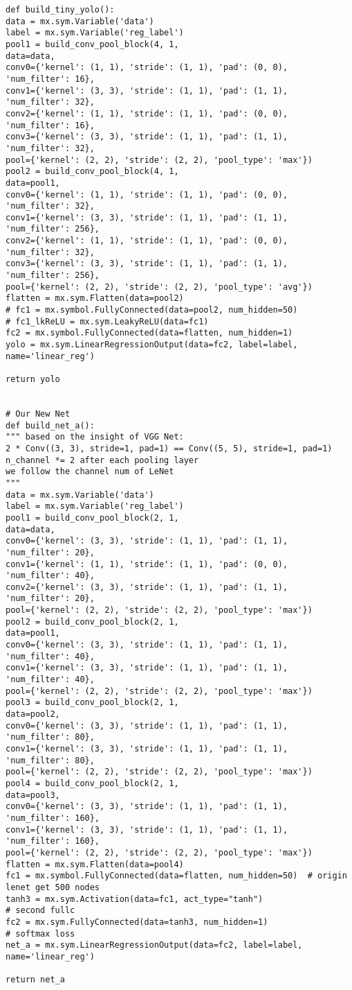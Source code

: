 \begin{verbatim}
def build_tiny_yolo():
data = mx.sym.Variable('data')
label = mx.sym.Variable('reg_label')
pool1 = build_conv_pool_block(4, 1,
data=data,
conv0={'kernel': (1, 1), 'stride': (1, 1), 'pad': (0, 0), 'num_filter': 16},
conv1={'kernel': (3, 3), 'stride': (1, 1), 'pad': (1, 1), 'num_filter': 32},
conv2={'kernel': (1, 1), 'stride': (1, 1), 'pad': (0, 0), 'num_filter': 16},
conv3={'kernel': (3, 3), 'stride': (1, 1), 'pad': (1, 1), 'num_filter': 32},
pool={'kernel': (2, 2), 'stride': (2, 2), 'pool_type': 'max'})
pool2 = build_conv_pool_block(4, 1,
data=pool1,
conv0={'kernel': (1, 1), 'stride': (1, 1), 'pad': (0, 0), 'num_filter': 32},
conv1={'kernel': (3, 3), 'stride': (1, 1), 'pad': (1, 1), 'num_filter': 256},
conv2={'kernel': (1, 1), 'stride': (1, 1), 'pad': (0, 0), 'num_filter': 32},
conv3={'kernel': (3, 3), 'stride': (1, 1), 'pad': (1, 1), 'num_filter': 256},
pool={'kernel': (2, 2), 'stride': (2, 2), 'pool_type': 'avg'})
flatten = mx.sym.Flatten(data=pool2)
# fc1 = mx.symbol.FullyConnected(data=pool2, num_hidden=50)
# fc1_lkReLU = mx.sym.LeakyReLU(data=fc1)
fc2 = mx.symbol.FullyConnected(data=flatten, num_hidden=1)
yolo = mx.sym.LinearRegressionOutput(data=fc2, label=label, name='linear_reg')

return yolo


# Our New Net
def build_net_a():
""" based on the insight of VGG Net:
2 * Conv((3, 3), stride=1, pad=1) == Conv((5, 5), stride=1, pad=1)
n_channel *= 2 after each pooling layer
we follow the channel num of LeNet
"""
data = mx.sym.Variable('data')
label = mx.sym.Variable('reg_label')
pool1 = build_conv_pool_block(2, 1,
data=data,
conv0={'kernel': (3, 3), 'stride': (1, 1), 'pad': (1, 1), 'num_filter': 20},
conv1={'kernel': (1, 1), 'stride': (1, 1), 'pad': (0, 0), 'num_filter': 40},
conv2={'kernel': (3, 3), 'stride': (1, 1), 'pad': (1, 1), 'num_filter': 20},
pool={'kernel': (2, 2), 'stride': (2, 2), 'pool_type': 'max'})
pool2 = build_conv_pool_block(2, 1,
data=pool1,
conv0={'kernel': (3, 3), 'stride': (1, 1), 'pad': (1, 1), 'num_filter': 40},
conv1={'kernel': (3, 3), 'stride': (1, 1), 'pad': (1, 1), 'num_filter': 40},
pool={'kernel': (2, 2), 'stride': (2, 2), 'pool_type': 'max'})
pool3 = build_conv_pool_block(2, 1,
data=pool2,
conv0={'kernel': (3, 3), 'stride': (1, 1), 'pad': (1, 1), 'num_filter': 80},
conv1={'kernel': (3, 3), 'stride': (1, 1), 'pad': (1, 1), 'num_filter': 80},
pool={'kernel': (2, 2), 'stride': (2, 2), 'pool_type': 'max'})
pool4 = build_conv_pool_block(2, 1,
data=pool3,
conv0={'kernel': (3, 3), 'stride': (1, 1), 'pad': (1, 1), 'num_filter': 160},
conv1={'kernel': (3, 3), 'stride': (1, 1), 'pad': (1, 1), 'num_filter': 160},
pool={'kernel': (2, 2), 'stride': (2, 2), 'pool_type': 'max'})
flatten = mx.sym.Flatten(data=pool4)
fc1 = mx.symbol.FullyConnected(data=flatten, num_hidden=50)  # origin lenet get 500 nodes
tanh3 = mx.sym.Activation(data=fc1, act_type="tanh")
# second fullc
fc2 = mx.sym.FullyConnected(data=tanh3, num_hidden=1)
# softmax loss
net_a = mx.sym.LinearRegressionOutput(data=fc2, label=label, name='linear_reg')

return net_a
\end{verbatim}

